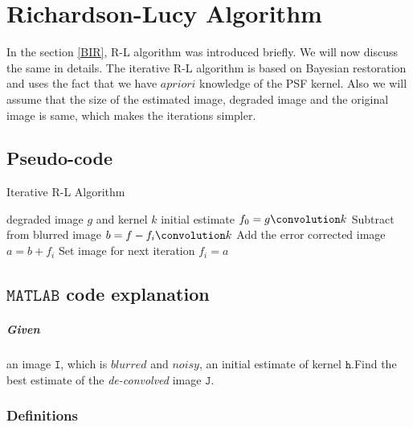\documentclass[a4paper]{book}
\begin{document}
\chapter[\LARGE Richardson-Lucy Algorithm]{Richardson-Lucy Algorithm}\label{chapRL}
\thispagestyle{empty}
In the section \ref{BIR}, R-L algorithm was introduced briefly. We will now discuss the same in details. The iterative R-L algorithm is based on Bayesian restoration and uses the fact that we have $ a priori $ knowledge of the PSF kernel. Also we will assume that the size of the estimated image, degraded image and the original image is same, which makes the iterations simpler.
\section{\Large Pseudo-code}\label{secPseudo}
\begin{algorithm}
	\caption{Iterative R-L Algorithm}
	\label{alg4}
	\begin{algorithmic}
		\STATE degraded image $ g $ and kernel $ k $
		\STATE initial estimate $ f_0 = g \convolution k $
			\STATE Subtract from blurred image $b = f - f_i \convolution k $
			\STATE Add the error corrected image $ a = b + f_i $
			\STATE Set image for next iteration $ f_i = a $
		\ENDFOR
	\end{algorithmic}
\end{algorithm}
\newpage
\section{\Large $ \mathtt{MATLAB} $ code explanation}\label{secMATLAB}

\paragraph* {Given} an image $\mathtt{I}$, which is $ \textit{blurred} $ and $ \textit{noisy} $, an initial estimate of kernel $\mathtt{h}$.Find the best estimate of the \textit{de-convolved} image $ \mathtt{J}$.\cite{matlabpaper1,matlabpaper2} 

\subsection{Definitions}
\end{document}
